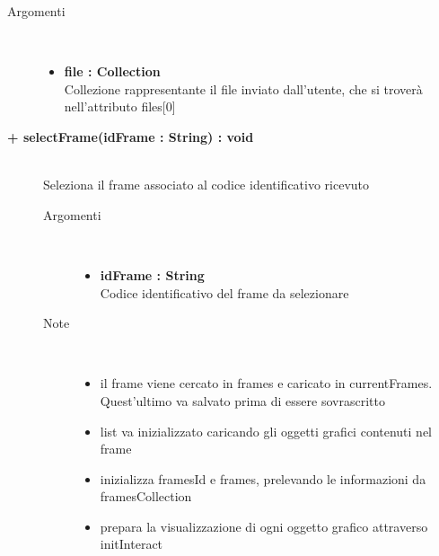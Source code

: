 \begin{description}
\begin{description}
		\begin{description}
			\item[Argomenti] \hfill \\
				\begin{itemize}
				
					\item \textbf{file : Collection		} \hfill \\
					Collezione rappresentante il file inviato dall'utente, che si troverà nell'attributo files[0]					
				\end{itemize}
				
		\end{description}
	\end{description}
	
	\begin{description}
		\item[\textbf{\color{blue}+ selectFrame(idFrame : String) : void  	}] \hfill \\
			Seleziona il frame associato al codice identificativo ricevuto
			
		\begin{description}
			\item[Argomenti] \hfill \\
				\begin{itemize}
				
					\item \textbf{idFrame : String	} \hfill \\
					Codice identificativo del frame da selezionare			
				\end{itemize}
			
			\item[Note] \hfill \\
			\begin{itemize}
					\item il frame viene cercato in frames e caricato in currentFrames. Quest'ultimo va salvato prima di essere sovrascritto
					\item list va inizializzato caricando gli oggetti grafici contenuti nel frame
					\item inizializza framesId e frames, prelevando le informazioni da framesCollection
					\item prepara la visualizzazione di ogni oggetto grafico attraverso initInteract
			\end{itemize}
				

\end{description}
\end{description}
\end{description}

